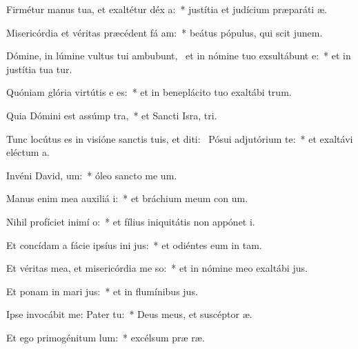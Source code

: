 \item Firmétur manus tua, et exaltétur déx a:~* justítia et judícium præparáti  æ.
\item Misericórdia et véritas præcédent fá am:~* beátus pópulus, qui scit junem.
\item Dómine, in lúmine vultus tui ambubunt,~\pscross{} et in nómine tuo exsultábunt  e:~* et in justítia tua tur.
\item Quóniam glória virtútis e  es:~* et in beneplácito tuo exaltábi  trum.
\item Quia Dómini est assúmp tra,~* et Sancti Isra,  tri.
\item Tunc locútus es in visióne sanctis tuis, et diti:~\pscross{} Pósui adjutórium  te:~* et exaltávi eléctum   a.
\item Invéni David,  um:~* óleo sancto me  um.
\item Manus enim mea auxiliá i:~* et bráchium meum con um.
\item Nihil profíciet inimí  o:~* et fílius iniquitátis non appónet  i.
\item Et concídam a fácie ipsíus ini jus:~* et odiéntes eum in  tam.
\item Et véritas mea, et misericórdia me  so:~* et in nómine meo exaltábi  jus.
\item Et ponam in mari  jus:~* et in flumínibus  jus.
\item Ipse invocábit me: Pater   tu:~* Deus meus, et suscéptor  æ.
\item Et ego primogénitum  lum:~* excélsum præ  ræ.

